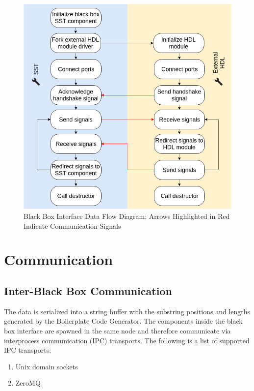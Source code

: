 \documentclass{article}
\begin{document}
  \begin{figure}[!h]
    \centering
    \includegraphics[width=5in]{diagrams/data_flow.png}
    \caption{Black Box Interface Data Flow Diagram; Arrows Highlighted in Red Indicate
    Communication Signals}
    \label{fig:data_flow}
  \end{figure}

  \section{Communication}

    \subsection{Inter-Black Box Communication} \label{sec:ipc}
    The data is serialized into a string buffer with the substring positions and lengths generated
    by the Boilerplate Code Generator. The components inside the black box interface are spawned in
    the same node and therefore communicate via interprocess communication (IPC) transports. The
    following is a list of supported IPC transports:
    \begin{enumerate}
      \item Unix domain sockets
      \item ZeroMQ
    \end{enumerate}
\end{document}
